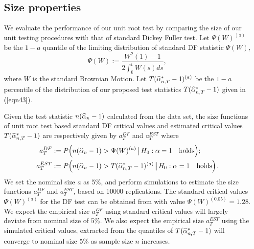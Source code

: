 \subsection{Size properties}
We evaluate the performance of our unit root test by comparing the size of our unit testing procedures with that of standard Dickey Fuller test. Let $\Psi(W)^{(a)}$ be the $1 - a$ quantile of the limiting distribution of standard DF statistic $\Psi(W)$,
\begin{equation}
\Psi(W) := \frac{W^2(1) - 1}{2 \int_{0}^t W(s) ds},
\end{equation}
where $W$ is the standard Brownian Motion. Let $T(\widehat{\alpha}_{n,T}^* - 1)^{(a)}$ be the $1 - a$ percentile of the distribution of our proposed test statistics $T(\widehat{\alpha}_{n,T}^* - 1)$ given in (\ref{eqn43}).

Given the test statistic $n( \widehat{\alpha}_n - 1)$ calculated from the data set, the size functions of unit root test based standard DF critical values and estimated critical values $T(\widehat{\alpha}_{n,T}^* - 1)$ are respectively given by $a_{T}^{DF}$ and $a_T^{EST}$ where
\begin{align}
a_T^{DF} & := P \Big ( n(\widehat{\alpha}_n - 1)  > \Psi(W)^{(a)}\, \big | \, H_0: \alpha = 1 \quad \mbox{holds} \Big ); \nonumber\\
a_T^{EST} & := P \Big ( n(\widehat{\alpha}_n - 1)  >  T(\widehat{\alpha}_{n,T}^* - 1)^{(a)} \, \big |\, H_0: \alpha = 1 \quad \mbox{holds} \Big ).
\end{align}
We set the nominal size $a$ as 5\%, and perform simulations to estimate the size functions $a_T^{DF}$ and $a_T^{EST}$, based on 10000 replications. The standard critical values $\Psi(W)^{(a)}$ for the DF test can be obtained from \cite{fuller1996} with value $\Psi(W)^{(0.05)} = 1.28$. We expect the empirical size $a_T^{DF}$ using standard critical values will largely deviate from nominal size of 5\%. We also expect the empirical size $a_T^{EST}$ using the simulated critical values, extracted from the quantiles of $T(\widehat{\alpha}_{n,T}^* - 1)$ will converge to nominal size 5\% as sample size $n$ increases.

